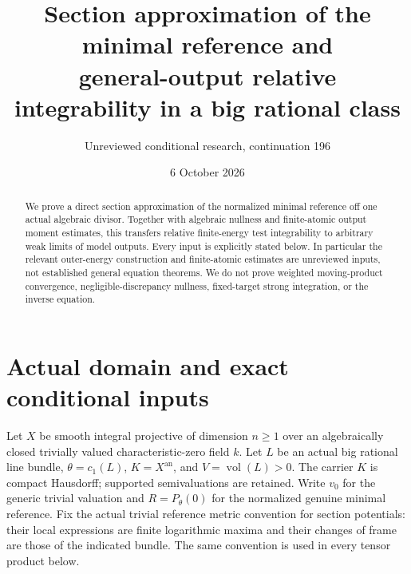 \documentclass[11pt]{article}
\title{Section approximation of the minimal reference and\protect\\
general-output relative integrability in a big rational class}
\author{Unreviewed conditional research, continuation 196}
\date{6 October 2026}
\newcommand{\vol}{\operatorname{vol}}
\newcommand{\an}{\mathrm{an}}
\begin{document}
\maketitle
\begin{abstract}
We prove a direct section approximation of the normalized minimal
reference off one actual algebraic divisor. Together with algebraic
nullness and finite-atomic output moment estimates, this transfers
relative finite-energy test integrability to arbitrary weak limits of
model outputs. Every input is explicitly stated below. In particular
the relevant outer-energy construction and finite-atomic estimates are
unreviewed inputs, not established general equation theorems. We do not
prove weighted moving-product convergence, negligible-discrepancy
nullness, fixed-target strong integration, or the inverse equation.
\end{abstract}

\section{Actual domain and exact conditional inputs}
Let $X$ be smooth integral projective of dimension $n\geq1$ over an
algebraically closed trivially valued characteristic-zero field $k$.
Let $L$ be an actual big rational line bundle, $\theta=c_1(L)$,
$K=X^\an$, and $V=\vol(L)>0$. The carrier $K$ is compact Hausdorff;
supported semivaluations are retained. Write $v_0$ for the generic
trivial valuation and $R=P_\theta(0)$ for the normalized genuine
minimal reference. Fix the actual trivial reference metric convention
for section potentials: their local expressions are finite logarithmic
maxima and their changes of frame are those of the indicated bundle.
The same convention is used in every tensor product below.
\end{document}

